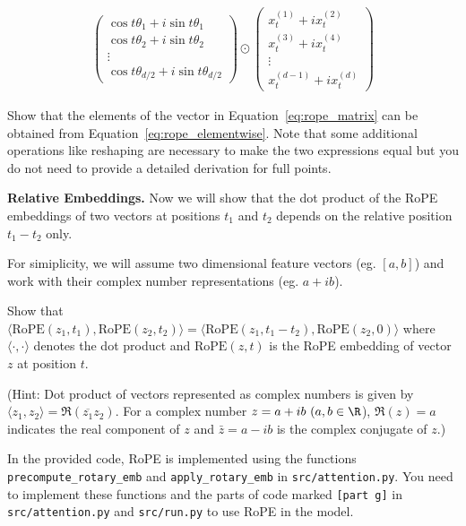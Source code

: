\begin{parts}
\begin{subparts}
\begin{align}\label{eq:rope_elementwise}
    \begin{pmatrix}
        \cos t\theta_1 + i\sin t\theta_1 \\
        \cos t\theta_2 + i\sin t\theta_2 \\
        \vdots \\
        \cos t\theta_{d/2} + i\sin t\theta_{d/2}
    \end{pmatrix}
    \odot
    \begin{pmatrix}
        x^{(1)}_t + i x^{(2)}_t \\
        x^{(3)}_t + i x^{(4)}_t \\
        \vdots \\
        x^{(d-1)}_t + i x^{(d)}_t
    \end{pmatrix}
\end{align}

Show that the elements of the vector in Equation~\ref{eq:rope_matrix} can be obtained from Equation~\ref{eq:rope_elementwise}. Note that some additional operations like reshaping are necessary to make the two expressions equal but you do not need to provide a detailed derivation for full points. 

\subpart[1] \textbf{Relative Embeddings.} Now we will show that the dot product of the RoPE embeddings of two vectors at positions $t_1$ and $t_2$ depends on the relative position $t_1 - t_2$ only. 

For simiplicity, we will assume two dimensional feature vectors (eg. $[a, b]$) and work with their complex number representations (eg. $a + ib$).

Show that $\langle \text{RoPE}(z_1, t_1), \text{RoPE}(z_2, t_2) \rangle = \langle \text{RoPE}(z_1, t_1 - t_2), \text{RoPE}(z_2, 0) \rangle$ where $\langle \cdot, \cdot \rangle$ denotes the dot product and $\text{RoPE}(z, t)$ is the RoPE embedding of vector $z$ at position $t$.

(Hint: Dot product of vectors represented as complex numbers is given by $\langle z_1, z_2 \rangle = \Re(\overline{z_1} z_2)$. For a complex number $z = a + ib\ (a,b\in\R$), $\Re(z) = a$ indicates the real component of $z$ and $\bar{z} = a - ib$ is the complex conjugate of $z$.)

\subpart[8] In the provided code, RoPE is implemented using the functions \texttt{precompute\_rotary\_emb} and \texttt{apply\_rotary\_emb} in \texttt{src/attention.py}. You need to implement these functions and the parts of code marked \texttt{[part g]} in \texttt{src/attention.py} and \texttt{src/run.py} to use RoPE in the model.


\end{subparts}
\end{parts}
